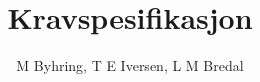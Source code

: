 \documentclass{}
\begin{document}
\author{M Byhring, T E Iversen, L M Bredal}
\title{Kravspesifikasjon}
\date{}
\end{document}
